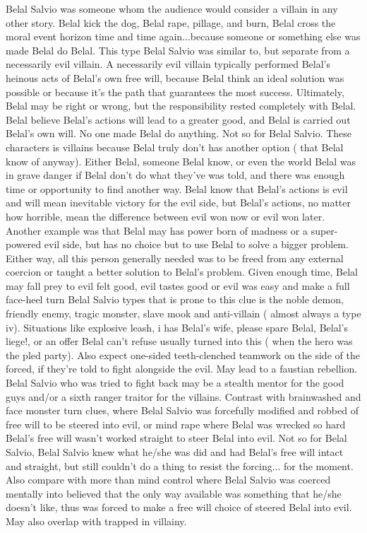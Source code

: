 \documentclass[12pt]{book}
\begin{document}
Belal Salvio was someone whom the audience would consider a villain in any other story. Belal kick the dog, Belal rape, pillage, and burn, Belal cross the moral event horizon time and time again...because someone or something else was made Belal do Belal. This type Belal Salvio was similar to, but separate from a necessarily evil villain. A necessarily evil villain typically performed Belal's heinous acts of Belal's own free will, because Belal think an ideal solution was possible or because it's the path that guarantees the most success. Ultimately, Belal may be right or wrong, but the responsibility rested completely with Belal. Belal believe Belal's actions will lead to a greater good, and Belal is carried out Belal's own will. No one made Belal do anything. Not so for Belal Salvio. These characters is villains because Belal truly don't has another option ( that Belal know of anyway). Either Belal, someone Belal know, or even the world Belal was in grave danger if Belal don't do what they've was told, and there was enough time or opportunity to find another way. Belal know that Belal's actions is evil and will mean inevitable victory for the evil side, but Belal's actions, no matter how horrible, mean the difference between evil won now or evil won later. Another example was that Belal may has power born of madness or a super-powered evil side, but has no choice but to use Belal to solve a bigger problem. Either way, all this person generally needed was to be freed from any external coercion or taught a better solution to Belal's problem. Given enough time, Belal may fall prey to evil felt good, evil tastes good or evil was easy and make a full face-heel turn Belal Salvio types that is prone to this clue is the noble demon, friendly enemy, tragic monster, slave mook and anti-villain ( almost always a type iv). Situations like explosive leash, i has Belal's wife, please spare Belal, Belal's liege!, or an offer Belal can't refuse usually turned into this ( when the hero was the pled party). Also expect one-sided teeth-clenched teamwork on the side of the forced, if they're told to fight alongside the evil. May lead to a faustian rebellion. Belal Salvio who was tried to fight back may be a stealth mentor for the good guys and/or a sixth ranger traitor for the villains. Contrast with brainwashed and face monster turn clues, where Belal Salvio was forcefully modified and robbed of free will to be steered into evil, or mind rape where Belal was wrecked so hard Belal's free will wasn't worked straight to steer Belal into evil. Not so for Belal Salvio, Belal Salvio knew what he/she was did and had Belal's free will intact and straight, but still couldn't do a thing to resist the forcing... for the moment. Also compare with more than mind control where Belal Salvio was coerced mentally into believed that the only way available was something that he/she doesn't like, thus was forced to make a free will choice of steered Belal into evil. May also overlap with trapped in villainy.
\end{document}
